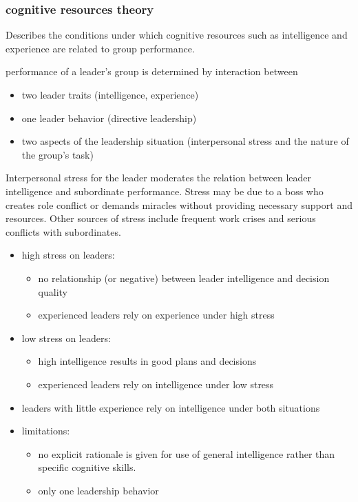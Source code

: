 
\subsubsection{cognitive resources theory} %
\label{ssub:cognitive_resources_theory}
	Describes the conditions under which cognitive resources such as intelligence and experience are related to group performance.


	performance of a leader’s group is determined by interaction between
	\begin{itemize}
		\item two leader traits (intelligence, experience)
		\item one leader behavior (directive leadership)
		\item two aspects of the leadership situation (interpersonal stress and the nature of the group’s task)
	\end{itemize}

	Interpersonal stress for the leader moderates the relation between leader intelligence and subordinate performance. Stress may be due to a boss who creates role conflict or demands miracles without providing necessary support and resources. Other sources of stress include frequent work crises and serious conflicts with subordinates.
\begin{itemize}
	\item high stress on leaders:
	\begin{itemize}
		\item no relationship (or negative) between leader intelligence and decision quality
		\item experienced leaders rely on experience under high stress
	\end{itemize}
	\item low stress on leaders:
	\begin{itemize}
		\item high intelligence results in good plans and decisions
		\item experienced leaders rely on intelligence under low stress
	\end{itemize}

\end{itemize}

\begin{itemize}
	\item leaders with little experience rely on intelligence under both situations
	\item limitations:
	\begin{itemize}
		\item no explicit rationale is given for use of general intelligence rather than specific cognitive skills.
		\item only one leadership behavior
	\end{itemize}
\end{itemize}

